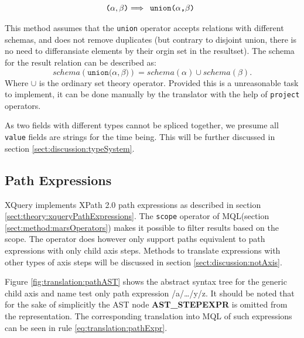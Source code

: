 \begin{equation}
\centering
\texttt{(} \alpha , \beta \texttt{)}
\Longrightarrow
\begin{array}{l}
\mbox{\texttt{union(}} 
\alpha \mbox{\texttt{,}} 
\beta \mbox{\texttt{)}}
\end{array}
\label{eq:translation:sequencing}
\end{equation}

This method assumes that the \texttt{union} operator accepts relations with
different schemas, and does not remove duplicates (but contrary to disjoint
union, there is no need to differansiate elements by their orgin set in the
resultset). The schema for the result relation can be described as:
\begin{equation*}
schema(\texttt{union(}\alpha, \beta\texttt{)}) = schema(\alpha) \cup
schema(\beta).
\end{equation*}
Where $\cup$ is the ordinary set theory operator. Provided this is a
unreasonable task to implement, it can be done manually by the translator with
the help of \texttt{project} operators.

As two fields with different types cannot be spliced together, we presume all
\texttt{value} fields are strings for the time being. This will be further
discussed in section \ref{sect:discussion:typeSystem}.



\subsection{Path Expressions}
\label{sect:translation:smpPathExpr}
XQuery implements XPath 2.0 path expressions as described in section
\ref{sect:theory:xqueryPathExpressions}. The \texttt{scope} operator of
MQL(section \ref{sect:method:marsOperators}) makes it possible to
filter results based on the scope. The operator does however only support paths
equivalent to path expressions with only \textsf{child} axis steps. Methods to
translate expressions with other types of axis steps will be discussed in
section \ref{sect:discussion:notAxis}.

Figure \ref{fig:translation:pathAST} shows the abstract syntax tree for the
generic child axis and name test only path expression \textsf{/a/\ldots/y/z}. It
should be noted that for the sake of simplicitly the AST node \textbf{AST\_STEPEXPR} is
omitted from the representation. The corresponding translation into MQL of such
expressions can be seen in rule \ref{eq:translation:pathExpr}.


